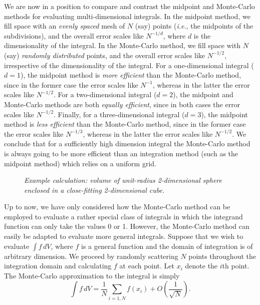 We are now in a position to compare and contrast the midpoint and Monte-Carlo
methods for evaluating multi-dimensional integrals.
In the midpoint method, we fill space with an {\em evenly spaced} mesh of $N$ (say) points
({\em i.e.}, the midpoints of the subdivisions), and
the overall error scales like $N^{-1/d}$, where $d$ is the dimensionality of the integral.
In the Monte-Carlo method, we fill space with $N$ (say) {\em randomly distributed}
points, and the overall error scales like $N^{-1/2}$, irrespective of the
dimensionality of the integral. For a one-dimensional integral ($d=1$), the
midpoint method is {\em more efficient} than the Monte-Carlo method, since in the
former case the error scales like $N^{-1}$, whereas in the latter  the
error scales like $N^{-1/2}$.  For a two-dimensional integral ($d=2$),
the midpoint and Monte-Carlo methods are both {\em equally efficient}, since in
both cases the error scales like  $N^{-1/2}$. Finally, for
a three-dimensional integral ($d=3$), the
midpoint method is {\em less efficient} than the Monte-Carlo method, since in the
former case the error scales like $N^{-1/3}$, whereas in the latter  the
error scales like $N^{-1/2}$. We conclude that for a sufficiently high dimension
integral the Monte-Carlo method is always going to be more efficient than an
integration method (such as the midpoint method) which relies on a uniform grid.

\begin{figure}
\epsfysize=2in
\centerline{}
\caption{\em Example calculation: volume of unit-radius 2-dimensional sphere enclosed
in a close-fitting 2-dimensional cube.}\label{exam}
\end{figure}

Up to now, we have only considered how the Monte-Carlo method can be employed to
evaluate a rather special class of integrals in which the integrand function
can only take the values 0 or 1. However, the Monte-Carlo method can easily be
adapted to evaluate more general integrals.  Suppose that we
wish to evaluate $\int f\,dV$, where $f$ is a general function and the
domain of integration is of arbitrary dimension. We proceed by randomly scattering
$N$ points throughout the integration domain and  calculating $f$ at each point.
Let $x_i$ denote the $i$th point. The Monte-Carlo approximation to the integral
is simply
\begin{equation}
\int f\,dV = \frac{1}{N}\sum_{i=1,N} f(x_i) + O\left(\frac{1}{\sqrt{N}}\right).
\end{equation}

